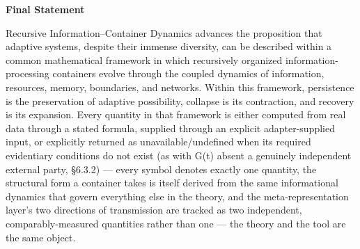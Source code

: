 \documentclass[
]{article}
\begin{document}
\textbf{Final Statement}

Recursive Information--Container Dynamics advances the proposition that
adaptive systems, despite their immense diversity, can be described
within a common mathematical framework in which recursively organized
information-processing containers evolve through the coupled dynamics of
information, resources, memory, boundaries, and networks. Within this
framework, persistence is the preservation of adaptive possibility,
collapse is its contraction, and recovery is its expansion. Every
quantity in that framework is either computed from real data through a
stated formula, supplied through an explicit adapter-supplied input, or
explicitly returned as unavailable/undefined when its required
evidentiary conditions do not exist (as with G(t) absent a genuinely
independent external party, §6.3.2) --- every symbol denotes exactly one
quantity, the structural form a container takes is itself derived from
the same informational dynamics that govern everything else in the
theory, and the meta-representation layer's two directions of
transmission are tracked as two independent, comparably-measured
quantities rather than one --- the theory and the tool are the same
object.
\end{document}
